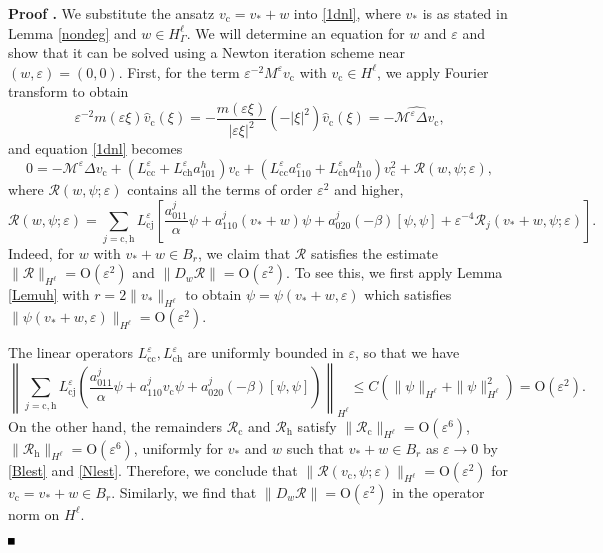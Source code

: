 \documentclass[10pt]{article}
\newenvironment{Proof}[1][\unskip]%
 {\begin{trivlist} \item[]{\bf Proof #1. }}%
 {\hspace*{\fill}$\rule{.4\baselineskip}{.4\baselineskip}$\end{trivlist}}
\newcommand{\rmO}{\mathrm{O}}
\newcommand{\eps}{\varepsilon}
\newcommand{\M}{\mathcal{M}}
\newcommand{\Rm}{\mathcal{R}}
\begin{document}
\begin{Proof}
We substitute the ansatz $v_\mathrm{c} = v_* + w$ into \eqref{1dnl}, where $v_*$ is as stated in Lemma \ref{nondeg} and $w \in H^\ell_{\Gamma}$. We will determine an equation for $w$ and $\eps$ and show that it can be solved using a Newton iteration scheme near $(w,\eps)=(0,0)$.
First, for the term $\eps^{-2}M^\eps v_\mathrm{c}$ with $v_\mathrm{c} \in H^\ell$, we apply Fourier transform to obtain
\[
\eps^{-2}m(\eps\xi)\widehat{v}_\mathrm{c}(\xi) = -\frac{m(\eps\xi)}{|\eps\xi|^2}(-|\xi|^2)\widehat{v}_\mathrm{c}(\xi) = -\widehat{\M^\eps \Delta v_\mathrm{c}},
\]
and equation \eqref{1dnl} becomes
\[
0 = -\M^\eps \Delta v_\mathrm{c} + \left(L_\mathrm{cc}^\eps +L_\mathrm{ch}^\eps a_{101}^h\right)v_\mathrm{c}+\left(L_\mathrm{cc}^\eps a_{110}^c+L_\mathrm{ch}^\eps a_{110}^h\right)v_\mathrm{c}^2 +{\Rm(w,\psi;\eps)},
\]
where ${\Rm(w,\psi;\eps)}$ contains all the terms of order $\eps^2$ and higher,
\[
\Rm(w,\psi;\eps) =\sum_{j=\mathrm{c,h}} L_\mathrm{cj}^\eps\left[ \frac{a_{011}^j}{\alpha}\psi+a_{110}^j (v_*+w)\psi+a_{020}^j (-\beta)[\psi,\psi]+\eps^{-4}\Rm_j(v_*+w,\psi;\eps)\right].
\]
Indeed, for $w$ with $v_*+w \in B_r$, we claim that $\Rm$ satisfies the estimate $\|\Rm\|_{H^\ell} = \rmO(\eps^2)$ {and $\|D_w\Rm\|=\rmO(\eps^2)$}.  To see this, we first apply Lemma \ref{Lemuh} with $r = 2\|v_*\|_{H^\ell}$ to obtain $\psi = \psi(v_*+w,\eps)$ which satisfies $\|\psi(v_*+w,\eps)\|_{H^\ell} = \rmO(\eps^2)$.   

The linear operators $L_\mathrm{cc}^\eps, L_\mathrm{ch}^\eps$ are uniformly bounded in $\eps$, so that we have
\[
\left\|\sum_{j=\mathrm{c,h}} L_\mathrm{cj}^\eps\left( \frac{a_{011}^j}{\alpha}\psi+a_{110}^j v_\mathrm{c}\psi+a_{020}^j (-\beta)[\psi,\psi]\right)\right\|_{H^\ell} \le C(\|\psi\|_{H^\ell}+\|\psi\|_{H^\ell}^2) = \rmO(\eps^2).
\]
On the other hand, the remainders $\Rm_\mathrm{c}$ and $\Rm_\mathrm{h}$ satisfy $\|\Rm_\mathrm{c}\|_{H^\ell}= \rmO(\eps^6)$, $\|\Rm_\mathrm{h}\|_{H^\ell} = \rmO(\eps^6)$, uniformly for $v_*$ and $w$ such that $v_* +w \in B_r$ as $\eps \to 0$ by  \eqref{Blest} and \eqref{Nlest}. Therefore, we conclude that $\|\Rm(v_\mathrm{c},\psi;\eps)\|_{H^\ell} = \rmO(\eps^2)$ for $v_\mathrm{c}=v_*+w \in B_r$. { Similarly, we find that $\|D_{w}\Rm\|=\rmO(\eps^2)$ in the operator norm on $H^\ell$.}
 

\end{Proof}
\end{document}
